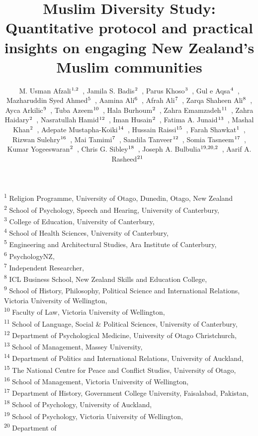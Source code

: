 \documentclass[
]{interact}
\title{Muslim Diversity Study: Quantitative protocol and practical
insights on engaging New Zealand's Muslim communities}
\author{M. Usman
Afzali$\textsuperscript{1,2}$~\orcidlink{0000-0001-5119-9388}, Jamila S.
Badis$\textsuperscript{2}$~\orcidlink{0009-0005-2866-5033}, Parus
Khoso$\textsuperscript{3}$~\orcidlink{0000-0001-6384-038X}, Gul e
Aqsa$\textsuperscript{4}$~\orcidlink{0009-0003-0928-8039}, Mazharuddin
Syed Ahmed$\textsuperscript{5}$~\orcidlink{0009-0006-9799-4049}, Aamina
Ali$\textsuperscript{6}$~\orcidlink{0009-0000-8153-8432}, Afrah
Ali$\textsuperscript{7}$~\orcidlink{0009-0004-5856-4025}, Zarqa Shaheen
Ali$\textsuperscript{8}$~\orcidlink{0000-0002-7145-5788}, Ayca
Arkilic$\textsuperscript{9}$~\orcidlink{0000-0002-1775-3311}, Tuba
Azeem$\textsuperscript{10}$~\orcidlink{0000-0002-0611-8726}, Hala
Burhoum$\textsuperscript{2}$~\orcidlink{0009-0004-3867-2029}, Zahra
Emamzadeh$\textsuperscript{11}$~\orcidlink{0009-0007-3065-2199}, Zahra
Haidary$\textsuperscript{2}$~\orcidlink{0009-0000-5259-622X}, Nasratullah
Hamid$\textsuperscript{12}$~\orcidlink{0009-0002-0120-7428}, Iman
Husain$\textsuperscript{2}$~\orcidlink{0000-0003-4032-4387}, Fatima A.
Junaid$\textsuperscript{13}$~\orcidlink{0000-0002-6656-8120}, Mashal
Khan$\textsuperscript{2}$~\orcidlink{0009-0004-5903-3306}, Adepate
Mustapha-Koiki$\textsuperscript{14}$~\orcidlink{0000-0003-4731-1781}, Hussain
Raissi$\textsuperscript{15}$~\orcidlink{0009-0000-7985-1622}, Farah
Shawkat$\textsuperscript{1}$~\orcidlink{0009-0006-0319-9117}, Rizwan
Sulehry$\textsuperscript{16}$~\orcidlink{0000-0002-1209-0635}, Mai
Tamimi$\textsuperscript{7}$~\orcidlink{0009-0001-7894-7259}, Sandila
Tanveer$\textsuperscript{12}$~\orcidlink{0000-0002-0648-5382}, Somia
Tasneem$\textsuperscript{17}$~\orcidlink{0000-0001-5471-6934}, Kumar
Yogeeswaran$\textsuperscript{2}$~\orcidlink{0000-0002-1978-5077}, Chris
G. Sibley$\textsuperscript{18}$~\orcidlink{0000-0002-4064-8800}, Joseph
A.
Bulbulia$\textsuperscript{19,20,2}$~\orcidlink{0000-0002-5861-2056}, Aarif
A. Rasheed$\textsuperscript{21}$~\orcidlink{0009-0004-7513-430X}}
\begin{document}
\captionsetup{labelsep=space}
\maketitle
\textsuperscript{1} Religion Programme, University of Otago, Dunedin,
Otago, New Zealand\\ \textsuperscript{2} School of Psychology, Speech
and Hearing, University of Canterbury,  \\ \textsuperscript{3} College
of Education, University of Canterbury,  \\ \textsuperscript{4} School
of Health Sciences, University of
Canterbury,  \\ \textsuperscript{5} Engineering and Architectural
Studies, Ara Institute of
Canterbury,  \\ \textsuperscript{6}  PsychologyNZ,  \\ \textsuperscript{7}  Independent
Researcher,  \\ \textsuperscript{8} ICL Business School, New Zealand
Skills and Education College,  \\ \textsuperscript{9} School of History,
Philosophy, Political Science and International Relations, Victoria
University of Wellington,  \\ \textsuperscript{10} Faculty of
Law, Victoria University of Wellington,  \\ \textsuperscript{11} School
of Language, Social \& Political Sciences, University of
Canterbury,  \\ \textsuperscript{12} Department of Psychological
Medicine, University of Otago
Christchurch,  \\ \textsuperscript{13} School of Management, Massey
University,  \\ \textsuperscript{14} Department of Politics and
International Relations, University of
Auckland,  \\ \textsuperscript{15} The National Centre for Peace and
Conflict Studies, University of Otago,  \\ \textsuperscript{16} School
of Management, Victoria University of
Wellington,  \\ \textsuperscript{17} Department of History, Government
College University, Faisalabad,
Pakistan,  \\ \textsuperscript{18} School of Psychology, University of
Auckland,  \\ \textsuperscript{19} School of Psychology, Victoria
University of Wellington,  \\ \textsuperscript{20} Department of
\end{document}
